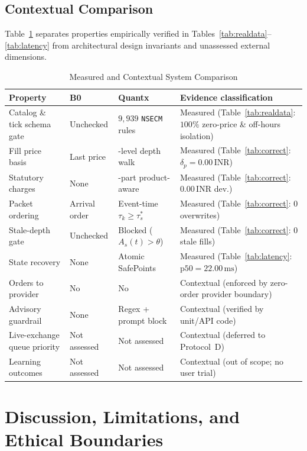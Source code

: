 \documentclass[journal,onecolumn,10pt]{IEEEtran}
\newcommand{\thinunit}[2]{#1\,\text{#2}}
\begin{document}
\subsection{Contextual Comparison}
Table~\ref{tab:context} separates properties empirically verified in Tables~\ref{tab:realdata}--\ref{tab:latency} from architectural design invariants and unassessed external dimensions.

\begin{table}[!t]
\caption{Measured and Contextual System Comparison}
\label{tab:context}
\centering
\small
\renewcommand{\arraystretch}{1.12}
\begin{tabularx}{\textwidth}{@{}>{\raggedright\arraybackslash}p{1.25in}>{\raggedright\arraybackslash}p{1.05in}>{\raggedright\arraybackslash}p{1.15in}X@{}}
\toprule
Property & B0 & Quantx & Evidence classification \\
\midrule
Catalog \& tick schema gate & Unchecked & $9{,}939$ \texttt{NSECM} rules & Measured (Table~\ref{tab:realdata}: $100\%$ zero-price \& off-hours isolation) \\
Fill price basis & Last price & 5-level depth walk & Measured (Table~\ref{tab:correct}: $\delta_p=\thinunit{0.00}{INR}$) \\
Statutory charges & None & 6-part product-aware & Measured (Table~\ref{tab:correct}: $\thinunit{0.00}{INR}$ dev.) \\
Packet ordering & Arrival order & Event-time $\tau_k \ge \tau^*_s$ & Measured (Table~\ref{tab:correct}: 0 overwrites) \\
Stale-depth gate & Unchecked & Blocked ($A_s(t)>\theta$) & Measured (Table~\ref{tab:correct}: 0 stale fills) \\
State recovery & None & Atomic SafePoints & Measured (Table~\ref{tab:latency}: $\text{p50}=\thinunit{22.00}{ms}$) \\
Orders to provider & No & No & Contextual (enforced by zero-order provider boundary) \\
Advisory guardrail & None & Regex + prompt block & Contextual (verified by unit/API code) \\
Live-exchange queue priority & Not assessed & Not assessed & Contextual (deferred to Protocol~D) \\
Learning outcomes & Not assessed & Not assessed & Contextual (out of scope; no user trial) \\
\bottomrule
\end{tabularx}
\end{table}

\section{Discussion, Limitations, and Ethical Boundaries}
\end{document}
